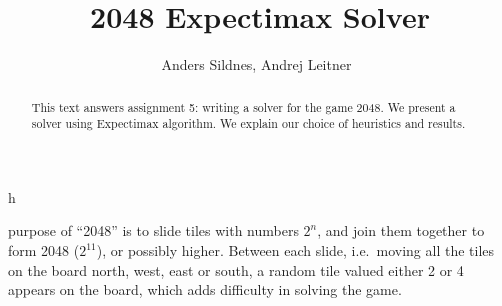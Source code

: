 \documentclass[journal]{IEEEtran}
\begin{document}
%
\title{2048 Expectimax Solver}

\author{Anders Sildnes, Andrej Leitner~%
}%

%
{h}

\maketitle

\begin{abstract}
    This text answers assignment 5: writing a solver for the game 2048.
    We present a solver using Expectimax algorithm. We explain our choice of
    heuristics and results.
\end{abstract}

 purpose of ``2048'' is to slide tiles with numbers
$2^{n}$, and join them together to form 2048 ($2^{11}$), or possibly higher.
Between each slide, i.e.\ moving all the tiles on the board north, west, east
or south, a random tile valued either 2 or 4 appears on the board, which adds
difficulty in solving the game.

\end{document}

